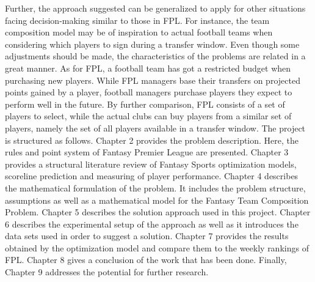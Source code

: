 Further, the approach suggested can be generalized to apply for other situations facing decision-making similar to those in FPL. For instance, the team composition model may be of inspiration to actual football teams when considering which players to sign during a transfer window. Even though some adjustments should be made, the characteristics of the problems are related in a great manner. As for FPL, a football team has got a restricted budget when purchasing new players. While FPL managers base their transfers on projected points gained by a player, football managers purchase players they expect to perform well in the future. By further comparison, FPL consists of a set of players to select, while the actual clubs can buy players from a similar set of players, namely the set of all players available in a transfer window.
\newpar
The project is structured as follows. Chapter 2 provides the problem description. Here, the rules and point system of Fantasy Premier League are presented. Chapter 3 provides a structural literature review of Fantasy Sports optimization models, scoreline prediction and measuring of player performance. Chapter 4 describes the mathematical formulation of the problem. It includes the problem structure, assumptions as well as a mathematical model for the Fantasy Team Composition Problem. Chapter 5 describes the solution approach used in this project. Chapter 6 describes the experimental setup of the approach as well as it introduces the data sets used in order to suggest a solution. Chapter 7 provides the results obtained by the optimization model and compare them to the weekly rankings of FPL. Chapter 8 gives a conclusion of the work that has been done. Finally, Chapter 9 addresses the potential for further research.



